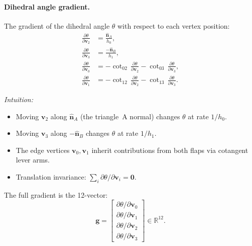 \paragraph{Dihedral angle gradient.}
The gradient of the dihedral angle $\theta$ with respect to each vertex position:
\begin{equation}
  \begin{aligned}
    \frac{\partial \theta}{\partial \mathbf{v}_2} &= \frac{\hat{\mathbf{n}}_A}{h_0}, \\[4pt]
    \frac{\partial \theta}{\partial \mathbf{v}_3} &= \frac{-\hat{\mathbf{n}}_B}{h_1}, \\[4pt]
    \frac{\partial \theta}{\partial \mathbf{v}_0} &= -\cot_{02}\, \frac{\partial \theta}{\partial \mathbf{v}_2} - \cot_{03}\, \frac{\partial \theta}{\partial \mathbf{v}_3}, \\[4pt]
    \frac{\partial \theta}{\partial \mathbf{v}_1} &= -\cot_{12}\, \frac{\partial \theta}{\partial \mathbf{v}_2} - \cot_{13}\, \frac{\partial \theta}{\partial \mathbf{v}_3}.
  \end{aligned}
\end{equation}

\noindent\textit{Intuition:}
\begin{itemize}
  \item Moving $\mathbf{v}_2$ along $\hat{\mathbf{n}}_A$ (the triangle~A normal) changes $\theta$ at rate $1/h_0$.
  \item Moving $\mathbf{v}_3$ along $-\hat{\mathbf{n}}_B$ changes $\theta$ at rate $1/h_1$.
  \item The edge vertices $\mathbf{v}_0, \mathbf{v}_1$ inherit contributions from both flaps via cotangent lever arms.
  \item Translation invariance: $\sum_i \partial\theta/\partial\mathbf{v}_i = \mathbf{0}$.
\end{itemize}

The full gradient is the 12-vector:
\begin{equation}
  \mathbf{g} = \begin{bmatrix}
    \partial\theta/\partial\mathbf{v}_0 \\
    \partial\theta/\partial\mathbf{v}_1 \\
    \partial\theta/\partial\mathbf{v}_2 \\
    \partial\theta/\partial\mathbf{v}_3
  \end{bmatrix} \in \mathbb{R}^{12}.
\end{equation}

